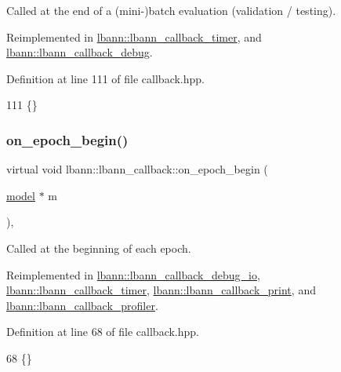 Called at the end of a (mini-\/)batch evaluation (validation / testing). 

Reimplemented in \hyperlink{classlbann_1_1lbann__callback__timer_a1a041e3b7cc2cfea68200d9467d3eaaf}{lbann\+::lbann\+\_\+callback\+\_\+timer}, and \hyperlink{classlbann_1_1lbann__callback__debug_a07a02eb525ebe9c06b361c48fc2977c8}{lbann\+::lbann\+\_\+callback\+\_\+debug}.



Definition at line 111 of file callback.\+hpp.


\begin{DoxyCode}
111 \{\}
\end{DoxyCode}
\mbox{\label{classlbann_1_1lbann__callback_a4ed9498763412a55953fff71ee3a9456}} 
\subsubsection{\texorpdfstring{on\+\_\+epoch\+\_\+begin()}{on\_epoch\_begin()}}
{\footnotesize\ttfamily virtual void lbann\+::lbann\+\_\+callback\+::on\+\_\+epoch\+\_\+begin (\begin{DoxyParamCaption}\item[{\hyperlink{classlbann_1_1model}{model} $\ast$}]{m }\end{DoxyParamCaption})\hspace{0.3cm}{\ttfamily [inline]}, {\ttfamily [virtual]}}

Called at the beginning of each epoch. 

Reimplemented in \hyperlink{classlbann_1_1lbann__callback__debug__io_aa3d2a6fb4d7375c05ece0058224ea792}{lbann\+::lbann\+\_\+callback\+\_\+debug\+\_\+io}, \hyperlink{classlbann_1_1lbann__callback__timer_aceecdd208aa8d75a49a41a33bf48314b}{lbann\+::lbann\+\_\+callback\+\_\+timer}, \hyperlink{classlbann_1_1lbann__callback__print_ae3c99d7c56ac33ab7e09880134b43cad}{lbann\+::lbann\+\_\+callback\+\_\+print}, and \hyperlink{classlbann_1_1lbann__callback__profiler_abd30d11df631eea086cdf213c9f0f4f9}{lbann\+::lbann\+\_\+callback\+\_\+profiler}.



Definition at line 68 of file callback.\+hpp.


\begin{DoxyCode}
68 \{\}
\end{DoxyCode}
\mbox{\label{classlbann_1_1lbann__callback_a1fc71110e7f754bf73c9e0f344a448a5}} 
